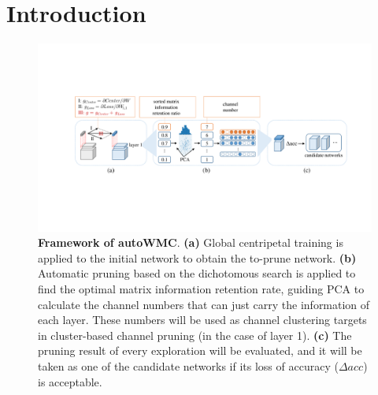 \documentclass[sigconf, 10pt]{acmart}
\begin{document}



\maketitle

\section{Introduction}\label{sec1}

\begin{figure}[t]
  \centering
  \includegraphics[width=\linewidth]{Fig1.pdf}
   \caption{\textbf{Framework of autoWMC}.  \textbf{(a)} Global centripetal training is applied to the initial network to obtain the to-prune network. \textbf{(b)} Automatic pruning based on the dichotomous search is applied to find the optimal matrix information retention rate, guiding PCA to calculate the channel numbers that can just carry the information of each layer. These numbers will be used as channel clustering targets in cluster-based channel pruning (in the case of layer 1). \textbf{(c)} The pruning result of every exploration will be evaluated, and it will be taken as one of the candidate networks if its loss of accuracy ($\Delta acc$) is acceptable.}
   \label{fig:1}
\end{figure}
\end{document}

